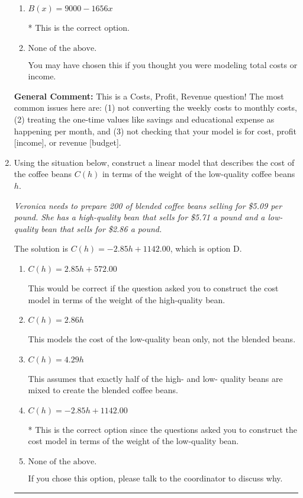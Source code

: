 \documentclass{extbook}[14pt]
\newcommand{\litem}[1]{\item #1

\rule{\textwidth}{0.4pt}}
\begin{document}
\begin{enumerate}
{\begin{enumerate}[label=\Alph*.]
This treats weekly expenses as month expenses rather than multiplying each weekly expense.
\item \( B(x) = 9000 - 1656 x \)

* This is the correct option.
\item \( \text{None of the above.} \)

You may have chosen this if you thought you were modeling total costs or income.
\end{enumerate}

\textbf{General Comment:} This is a Costs, Profit, Revenue question! The most common issues here are: (1) not converting the weekly costs to monthly costs, (2) treating the one-time values like savings and educational expense as happening per month, and (3) not checking that your model is for cost, profit [income], or revenue [budget].
}
\litem{
Using the situation below, construct a linear model that describes the cost of the coffee beans $C(h)$ in terms of the weight of the low-quality coffee beans $h$.

\begin{center}
    \textit{ Veronica needs to prepare 200 of blended coffee beans selling for \$5.09 per pound. She has a high-quality bean that sells for \$5.71 a pound and a low-quality bean that sells for \$2.86 a pound. }
\end{center}


The solution is \( C(h) = -2.85 h + 1142.00 \), which is option D.\begin{enumerate}[label=\Alph*.]
\item \( C(h) = 2.85 h + 572.00 \)

This would be correct if the question asked you to construct the cost model in terms of the weight of the high-quality bean.
\item \( C(h) = 2.86 h \)

This models the cost of the low-quality bean only, not the blended beans.
\item \( C(h) = 4.29 h \)

This assumes that exactly half of the high- and low- quality beans are mixed to create the blended coffee beans.
\item \( C(h) = -2.85 h + 1142.00 \)

* This is the correct option since the questions asked you to construct the cost model in terms of the weight of the low-quality bean.
\item \( \text{None of the above.} \)

If you chose this option, please talk to the coordinator to discuss why.
\end{enumerate}

}
\end{enumerate}
\end{document}
